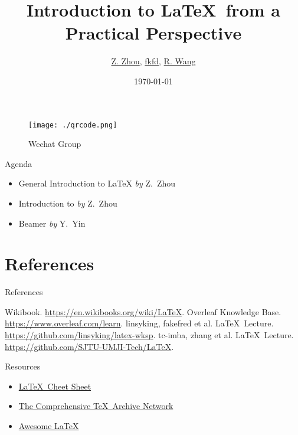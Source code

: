 \documentclass[aspectratio=169]{beamer}
\title{Introduction to \LaTeX\  from a Practical Perspective}
\author{\hyperlink{https://github.com/TechJI-2023/latex_wksp}{Z. Zhou}, \hyperlink{https://github.com/fakefred}{fkfd}, \hyperlink{https://github.com/Hydraallen}{R. Wang}}
\institute{TechJI}
\date{\today}
\newcommand{\packagename}[1]{\structure{\texttt{#1}}}
\begin{document}
\begin{frame}
    \titlepage
    \begin{figure}
        \centering
        \caption*{Wechat Group}
        \texttt{[image: ./qrcode.png]}
    \end{figure}
\end{frame}

\begin{frame}{Agenda}
    \begin{itemize}
        \item General Introduction to \LaTeX \hspace*{\fill} \textit{by} Z.~Zhou
        \item Introduction to \packagename{Tikz} \hspace*{\fill} \textit{by} Z.~Zhou
        \item Beamer \hspace*{\fill} \textit{by} Y.~Yin
    \end{itemize}
\end{frame}







\section*{References}

\begin{frame}{References}
    \begin{thebibliography}{9}
        Wikibook. \url{https://en.wikibooks.org/wiki/LaTeX}.
        Overleaf Knowledge Base. \url{https://www.overleaf.com/learn}.
        linsyking, fakefred et al. \LaTeX\ Lecture. \url{https://github.com/linsyking/latex-wksp}.
        tc-imba, zhang et al. \LaTeX\ Lecture. \url{https://github.com/SJTU-UMJI-Tech/LaTeX}.
    \end{thebibliography}
\end{frame}

\begin{frame}{Resources}
    \begin{itemize}
        \item \href{https://wch.github.io/latexsheet/}{\LaTeX\  Cheet Sheet}
        \item \href{https://www.ctan.org/}{The Comprehensive \TeX\ Archive Network}
        \item \href{https://github.com/egeerardyn/awesome-LaTeX}{Awesome \LaTeX}
    \end{itemize}
\end{frame}
\end{document}
